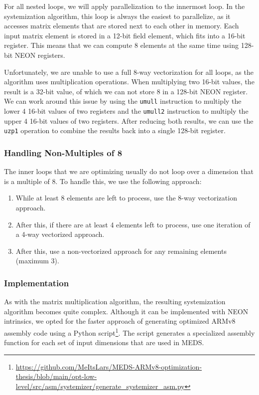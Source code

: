 \documentclass[11pt,a4paper]{report}
\theoremstyle{definition}
\begin{document}
For all nested loops, we will apply parallelization to the innermost loop. In the systemization algorithm, this loop is always the easiest to parallelize, as it accesses matrix elements that are stored next to each other in memory. Each input matrix element is stored in a 12-bit field element, which fits into a 16-bit register. This means that we can compute 8 elements at the same time using 128-bit NEON registers.

Unfortunately, we are unable to use a full 8-way vectorization for all loops, as the algorithm uses multiplication operations. When multiplying two 16-bit values, the result is a 32-bit value, of which we can not store 8 in a 128-bit NEON register. We can work around this issue by using the \texttt{umull} instruction to multiply the lower 4 16-bit values of two registers and the \texttt{umull2} instruction to multiply the upper 4 16-bit values of two registers. After reducing both results, we can use the \texttt{uzp1} operation to combine the results back into a single 128-bit register.

\subsubsection{Handling Non-Multiples of 8}
\label{sec:matrixsystemizationnonmultiples}
The inner loops that we are optimizing usually do not loop over a dimension that is a multiple of 8. To handle this, we use the following approach:
\begin{enumerate}
  \item While at least 8 elements are left to process, use the 8-way vectorization approach.
  \item After this, if there are at least 4 elements left to process, use one iteration of a 4-way vectorized approach.
  \item After this, use a non-vectorized approach for any remaining elements (maximum 3).
\end{enumerate}

\subsubsection{Implementation}
As with the matrix multiplication algorithm, the resulting systemization algorithm becomes quite complex. Although it can be implemented with NEON intrinsics, we opted for the faster approach of generating optimized ARMv8 assembly code using a Python script\footnote{\url{https://github.com/MeItsLars/MEDS-ARMv8-optimization-thesis/blob/main/opt-low-level/src/asm/systemizer/generate\_systemizer\_asm.py}}. The script generates a specialized assembly function for each set of input dimensions that are used in MEDS.
\end{document}
